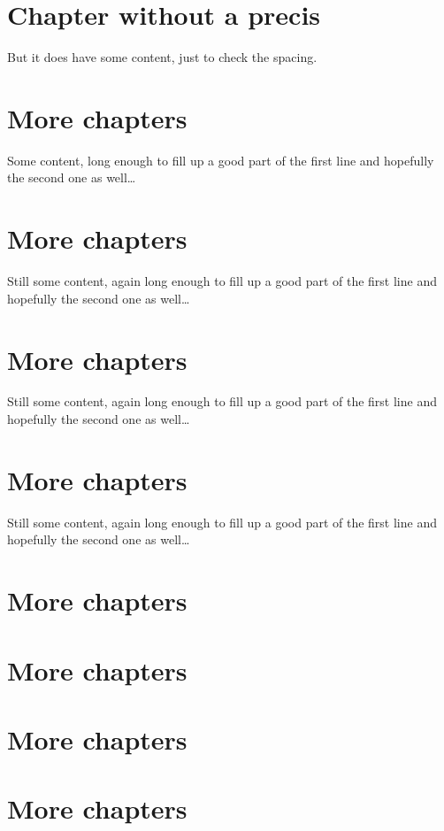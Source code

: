 \documentclass{sbabook}
\begin{document}
\chapter{Chapter without a precis}

But it does have some content, just to check the spacing.

\chapter{More chapters}

Some content, long enough to fill up a good part of the first line and hopefully the second one as well…

\chapter{More chapters}

Still some content, again long enough to fill up a good part of the first line and hopefully the second one as well…

\chapter{More chapters}

Still some content, again long enough to fill up a good part of the first line and hopefully the second one as well…

\chapter{More chapters}

Still some content, again long enough to fill up a good part of the first line and hopefully the second one as well…

\chapter{More chapters}

\chapter{More chapters}

\chapter{More chapters}

\chapter{More chapters}

\backmatter
\end{document}
